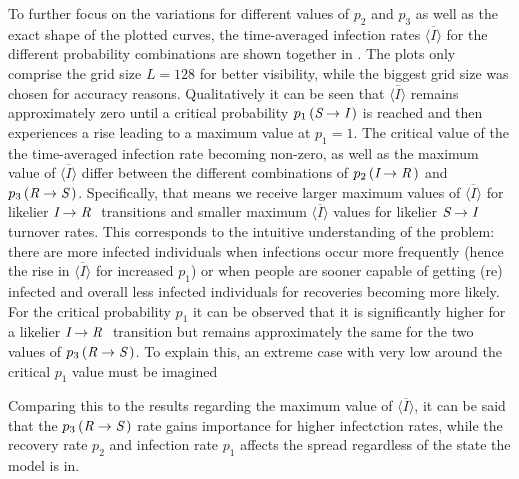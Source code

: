 To further focus on the variations for different values of $p_2$ and $p_3$ as well as the exact shape of the plotted curves, the time-averaged infection rates $\overline{\langle I\rangle}$ for the different probability 
combinations are shown together in . The plots only comprise the grid size $L=128$ for better visibility, while the biggest grid size was chosen for accuracy reasons. 
Qualitatively it can be seen that $\overline{\langle I\rangle}$ remains approximately zero until a critical probability $p_1\left(\textit{S}\rightarrow\textit{I}\,\right)$ is reached and then
experiences a rise leading to a maximum value at $p_1=1$. The critical value of the the time-averaged infection rate becoming non-zero, as well as the maximum value of $\overline{\langle I\rangle}$ 
differ between the different combinations of $p_2\left(\textit{I}\rightarrow\textit{R}\,\right)$ and $p_3\left(\textit{R}\rightarrow\textit{S}\,\right)$. Specifically, that means we receive larger maximum values
of $\overline{\langle I\rangle}$ for likelier $\textit{I}\rightarrow\textit{R}~$ transitions and smaller maximum $\overline{\langle I\rangle}$ values for likelier $\textit{S}\rightarrow\textit{I}~$
turnover rates. This corresponds to the intuitive understanding of the problem: there are more infected individuals when infections occur more frequently (hence the rise in $\overline{\langle I\rangle}$ for increased $p_1$) 
or when people are sooner capable of getting (re)\,infected and overall less infected individuals for recoveries becoming more likely. For the critical probability $p_1$ it can be observed that
it is significantly higher for a likelier $\textit{I}\rightarrow\textit{R}~$ transition but remains approximately the same for the two values of $p_3\left(\textit{R}\rightarrow\textit{S}\,\right)$.
To explain this, an extreme case with very low around the critical $p_1$ value must be imagined

Comparing this to the results regarding the maximum value of $\overline{\langle I\rangle}$, it can be said that the $p_3\left(\textit{R}\rightarrow\textit{S}\,\right)$ rate 
gains importance for higher infectction rates, while the recovery rate $p_2$ and infection rate $p_1$ affects the spread regardless of the state the model is in.

